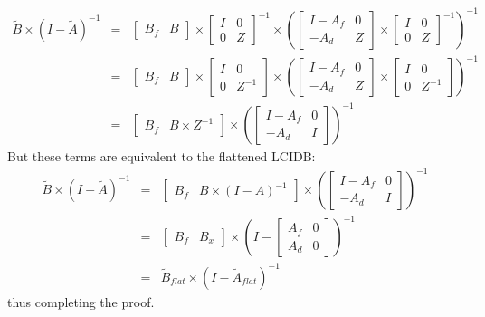 \begin{eqnarray}
  \tilde{B}\times(I-\tilde{A})^{-1}
  &=& \left[\begin{array}{cc}B_f & B\end{array}\right]\times 
      \left[\begin{array}{cc}I & 0 \\ 0 & Z\end{array}\right]^{-1}\times
\left(
\left[\begin{array}{cc}I-A_f & 0 \\ -A_d & Z\end{array}\right]\times
    \left[\begin{array}{cc}I & 0 \\ 0 & Z\end{array}\right]^{-1}\right)^{-1}\\
  &=&   \left[\begin{array}{cc}B_f & B\end{array}\right]\times 
      \left[\begin{array}{cc}I & 0 \\ 0 & Z^{-1}\end{array}\right]\times
\left(
\left[\begin{array}{cc}I-A_f & 0 \\ -A_d & Z\end{array}\right]\times
\left[\begin{array}{cc}I & 0 \\ 0 & Z^{-1}\end{array}\right]\right)^{-1}\\
 &=& \left[\begin{array}{cc}B_f & B\times Z^{-1}\end{array}\right]\times
\left(\left[\begin{array}{cc}I-A_f & 0 \\ -A_d & I\end{array}\right]\right)^{-1}
\end{eqnarray}
But these terms are equivalent to the flattened LCIDB:
\begin{eqnarray}
  \tilde{B}\times(I-\tilde{A})^{-1} &=&
  \left[\begin{array}{cc}B_f & B\times (I-A)^{-1}\end{array}\right]\times
\left(\left[\begin{array}{cc}I-A_f & 0 \\ -A_d & I\end{array}\right]\right)^{-1} \\
&=& \left[\begin{array}{cc}B_f & B_x\end{array}\right]\times
\left(I-\left[\begin{array}{cc}A_f & 0 \\ A_d & 0\end{array}\right]\right)^{-1}\\
&=& \tilde{B}_{flat}\times(I-\tilde{A}_{flat})^{-1}\label{eqn:si-flat}
\end{eqnarray}
thus completing the proof.
